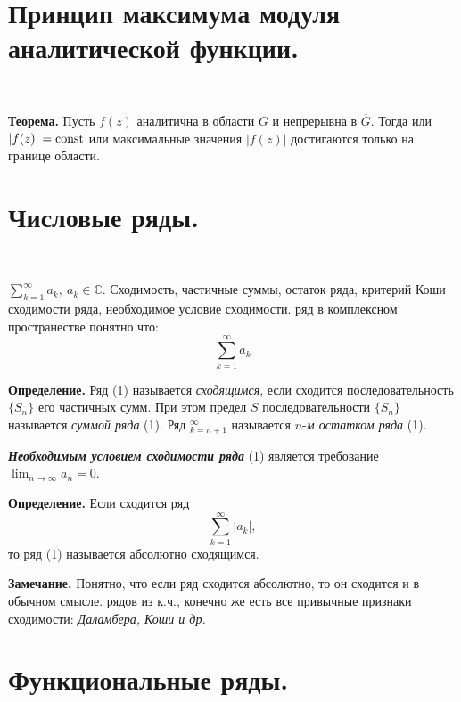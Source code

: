 \documentclass[9pt]{article}
\begin{document}
\section{Принцип максимума модуля аналитической функции.}

\ 
\par\textbf{Теорема.} Пусть \(f(z)\) аналитична в области \(G\) и непрерывна в \(\overline G\). Тогда или \(|f(z)|=\operatorname{const}\) или максимальные значения \(|f(z)|\) достигаются только на границе области.

\section{Числовые ряды.}

\ 
\par\(\displaystyle\sum_{k=1}^\infty a_k,\ a_k\in\mathbb C\). Сходимость, частичные суммы, остаток ряда, критерий Коши сходимости ряда, необходимое условие сходимости.
 ряд в комплексном пространестве понятно что: \begin{equation}
    \displaystyle\sum_{k=1}^\infty a_k
\end{equation}
\par\textbf{Определение.} Ряд (1) называется \textit{сходящимся}, если сходится последовательность \(\{S_n\}\) его частичных сумм. При этом предел \(S\) последовательности \(\{S_n\}\) называется \textit{суммой ряда} (1). Ряд \(\displaystyle_{k=n+1}^\infty\) называется \(n\)-\textit{м остатком ряда} (1).
\par\textit{\textbf{Необходимым условием сходимости ряда}} (1) является требование \(\displaystyle\lim_{n\to\infty}a_n=0\).
\par\textbf{Определение.} Если сходится ряд \[\displaystyle\sum_{k=1}^\infty |a_k|,\]
то ряд (1) называется абсолютно сходящимся.
\par\textbf{Замечание.} Понятно, что если ряд сходится абсолютно, то он сходится и в обычном смысле.
\parДля рядов из к.ч., конечно же есть все привычные признаки сходимости: \textit{Даламбера, Коши и др.}

\section{Функциональные ряды.}
\end{document}
